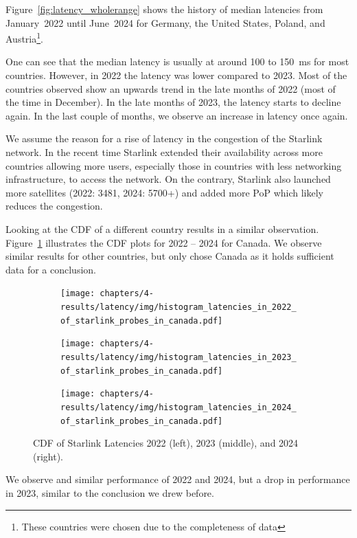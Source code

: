 Figure~\ref{fig:latency_wholerange} shows the history of median latencies from January~2022 until June~2024 for Germany, the United States, Poland, and Austria\footnote{These countries were chosen due to the completeness of data}.

One can see that the median latency is usually at around 100 to 150~ms for most countries. However, in 2022 the latency was lower compared to 2023. Most of the countries observed show an upwards trend in the late months of 2022 (most of the time in December). In the late months of 2023, the latency starts to decline again. In the last couple of months, we observe an increase in latency once again.

We assume the reason for a rise of latency in the congestion of the Starlink network. In the recent time Starlink extended their availability across more countries allowing more users, especially those in countries with less networking infrastructure, to access the network.
On the contrary, Starlink also launched more satellites (2022: 3481, 2024: 5700+) and added more \ac{PoP} which likely reduces the congestion.

Looking at the CDF of a different country results in a similar observation. Figure~\ref{fig:latency-cdfs-canada} illustrates the CDF plots for 2022 -- 2024 for Canada. We observe similar results for other countries, but only chose Canada as it holds sufficient data for a conclusion.

\begin{figure}
	\centering
	\begin{subfigure}[b]{0.3\linewidth}
		\texttt{[image: chapters/4-results/latency/img/histogram\_latencies\_in\_2022\_of\_starlink\_probes\_in\_canada.pdf]}
	\end{subfigure}
	\begin{subfigure}[b]{0.3\linewidth}
		\texttt{[image: chapters/4-results/latency/img/histogram\_latencies\_in\_2023\_of\_starlink\_probes\_in\_canada.pdf]}
	\end{subfigure}
	\begin{subfigure}[b]{0.3\linewidth}
		\texttt{[image: chapters/4-results/latency/img/histogram\_latencies\_in\_2024\_of\_starlink\_probes\_in\_canada.pdf]}
	\end{subfigure}
	\caption{CDF of Starlink Latencies 2022 (left), 2023 (middle), and 2024 (right).}
	\label{fig:latency-cdfs-canada}
\end{figure}

We observe and similar performance of 2022 and 2024, but a drop in performance in 2023, similar to the conclusion we drew before.

